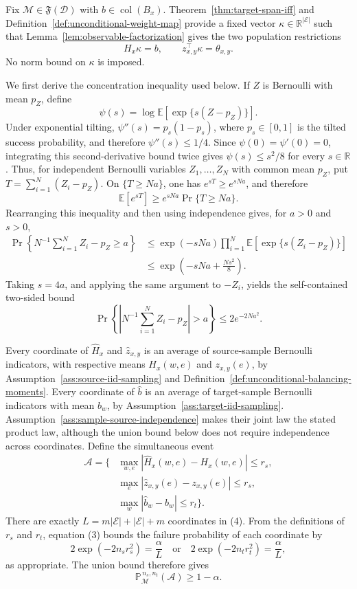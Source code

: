 Fix \(\mathcal M\in\mathfrak F(\mathcal D)\) with \(b\in\operatorname{col}(B_x)\). Theorem~\ref{thm:target-span-iff} and Definition~\ref{def:unconditional-weight-map} provide a fixed vector \(\kappa\in\mathbb R^{\lvert\mathcal E\rvert}\) such that Lemma~\ref{lem:observable-factorization} gives the two population restrictions
\[
H_x\kappa=b,
\qquad
z_{x,y}^{\top}\kappa=\theta_{x,y}.
\tag{1}
\]
No norm bound on \(\kappa\) is imposed.

We first derive the concentration inequality used below. If \(Z\) is Bernoulli with mean \(p_Z\), define
\[
\psi(s)=\log\mathbb E\!\left[\exp\{s(Z-p_Z)\}\right].
\]
Under exponential tilting, \(\psi''(s)=p_s(1-p_s)\), where \(p_s\in[0,1]\) is the tilted success probability, and therefore \(\psi''(s)\le1/4\). Since \(\psi(0)=\psi'(0)=0\), integrating this second-derivative bound twice gives \(\psi(s)\le s^2/8\) for every \(s\in\mathbb R\). Thus, for independent Bernoulli variables \(Z_1,\ldots,Z_N\) with common mean \(p_Z\), put \(T=\sum_{i=1}^N(Z_i-p_Z)\). On \(\{T\ge Na\}\), one has \(e^{sT}\ge e^{sNa}\), and therefore
\[
\mathbb E[e^{sT}]\ge e^{sNa}\Pr\{T\ge Na\}.
\]
Rearranging this inequality and then using independence gives, for \(a>0\) and \(s>0\),
\[
\begin{aligned}
\Pr\!\left\{N^{-1}\sum_{i=1}^N Z_i-p_Z\ge a\right\}
&\le \exp(-sNa)\prod_{i=1}^N
 \mathbb E\!\left[\exp\{s(Z_i-p_Z)\}\right]\\
&\le\exp\!\left(-sNa+\frac{Ns^2}{8}\right).
\end{aligned}
\tag{2}
\]
Taking \(s=4a\), and applying the same argument to \(-Z_i\), yields the self-contained two-sided bound
\[
\Pr\!\left\{\left|N^{-1}\sum_{i=1}^N Z_i-p_Z\right|>a\right\}
\le2e^{-2Na^2}.
\tag{3}
\]

Every coordinate of \(\widehat H_x\) and \(\widehat z_{x,y}\) is an average of source-sample Bernoulli indicators, with respective means \(H_x(w,e)\) and \(z_{x,y}(e)\), by Assumption~\ref{ass:source-iid-sampling} and Definition~\ref{def:unconditional-balancing-moments}. Every coordinate of \(\widehat b\) is an average of target-sample Bernoulli indicators with mean \(b_w\), by Assumption~\ref{ass:target-iid-sampling}. Assumption~\ref{ass:sample-source-independence} makes their joint law the stated product law, although the union bound below does not require independence across coordinates. Define the simultaneous event
\[
\begin{aligned}
\mathcal A=\{&\max_{w,e}|\widehat H_x(w,e)-H_x(w,e)|\le r_s,\\
&\max_e|\widehat z_{x,y}(e)-z_{x,y}(e)|\le r_s,\\
&\max_w|\widehat b_w-b_w|\le r_t\}.
\end{aligned}
\tag{4}
\]
There are exactly \(L=m\lvert\mathcal E\rvert+\lvert\mathcal E\rvert+m\) coordinates in (4). From the definitions of \(r_s\) and \(r_t\), equation (3) bounds the failure probability of each coordinate by
\[
2\exp(-2n_s r_s^2)=\frac{\alpha}{L}
\quad\text{or}\quad
2\exp(-2n_t r_t^2)=\frac{\alpha}{L},
\tag{5}
\]
as appropriate. The union bound therefore gives
\[
\mathbb P_{\mathcal M}^{\,n_s,n_t}(\mathcal A)\ge1-\alpha.
\tag{6}
\]

